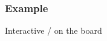 \begin{frame}\frametitle{Example}
	Interactive / on the board
\end{frame}
\begin{comment}
\begin{frame}\frametitle{PFR example}
	\begin{itemize}
		\item	{\color{blue}Ex 2-2} Soln:
		\item	(a) $$V = \frac{F_{A0}X}{(-r_A)_\text{exit}}$$ Given: $X = 0.8$

		From Table 2.3 $$\left(\frac{1}{-r_A}\right)_{X=0.8} = 20 \frac{\text{m}^3\cdot\text{s}}{\text{mol}}$$ Given: $F_{A0} = 0.4$mol/s $$\Rightarrow V = (0.4)(0.8)(20) = 6.4\text{m}^3$$
		\item	(b)
	\end{itemize}
\end{frame}

\begin{frame}[allowframebreaks]\frametitle{PFR example}

	Ex 2-3 Solution:

	(a)
	\begin{align*}
		&F_{A0}\frac{dX}{dV} = -r_A\\
		&V = \int_0^VdV = F_{A0}\int_0^X\frac{dX}{-r_A(X)}
	\end{align*}

	Trapezoidal formula: 

	$$\int_a^bf(x)dx\approx\frac{h}{2}(f_0 + 2f_1 + 2f_2 + \cdots + 2f_{n-1} + f_n)$$ 

	Simpson's rule for $n$ even: $$\int_a^bf(x)dx\approx\frac{h}{3}(f_0 + 4f_1 + 2f_2 + 4f_3 + \cdots + 2f_{n-2} + 4f_{n-1} + f_n)$$

	Applying Simpson's rule to Ex 2-3,
	\begin{align*}
		V &= F_{A0}\int_0^{0.8}\left(-\frac{1}{r_A(X)}\right)dX\\
		&= F_{A0}\frac{\Delta X}{3}\left[\left(-\left.\frac{1}{r_A}\right|_{X=0}\right) + 4\left(-\left.\frac{1}{r_A}\right|_{X=0.2}\right)\right.\\
		&\left.\hspace{5em}+ \cdots + \left(-\left.\frac{1}{r_A}\right|_{X=0.8}\right)\right]
	\end{align*}

	Using $\dfrac{1}{-r_A}$ values in Table 2-3 gives $V=2.165\,\text{m}^3$

	(b) $$V = \int_0^{0.8}\left(\frac{F_{A0}}{-r_A}\right)dX$$


\end{comment}
